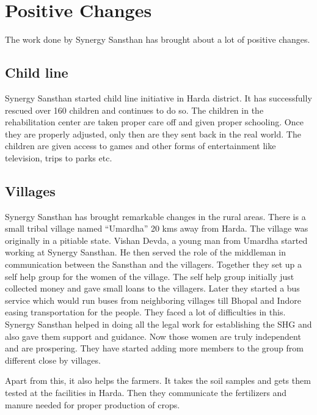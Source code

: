 \chapter{Positive Changes}
\ifpdf
    \graphicspath{{Chapter2/Chapter2Figs/PNG/}{Chapter2/Chapter2Figs/PDF/}{Chapter2/Chapter2Figs/}}
\else
    \graphicspath{{Chapter2/Chapter2Figs/EPS/}{Chapter2/Chapter2Figs/}}
\fi

The work done by Synergy Sansthan has brought about a lot of positive changes.

\section{Child line}
Synergy Sansthan started child line initiative in Harda district. It has successfully rescued over 160 children and continues to do so. The children in the rehabilitation center are taken proper care off and given proper schooling. Once they are properly adjusted, only then are they sent back in the real world. The children are given access to games and other forms of entertainment like television, trips to parks etc. 

\section{Villages}
Synergy Sansthan has brought remarkable changes in the rural areas. There is a small tribal village named ``Umardha'' 20 kms away from Harda. The village was originally in a pitiable state. Vishan Devda, a young man from Umardha started working at Synergy Sansthan. He then served the role of the middleman in communication between the Sansthan and the villagers. Together they set up a self help group for the women of the village. The self help group initially just collected money and gave small loans to the villagers. Later they started a bus service which would run buses from neighboring villages till Bhopal and Indore easing transportation for the people. They faced a lot of difficulties in this. Synergy Sansthan helped in doing all the legal work for establishing the SHG and also gave them support and guidance. Now those women are truly independent and are prospering. They have started adding more members to the group from different close by villages.

Apart from this, it also helps the farmers. It takes the soil samples and gets them tested at the facilities in Harda. Then they communicate the fertilizers and manure needed for proper production of crops.


